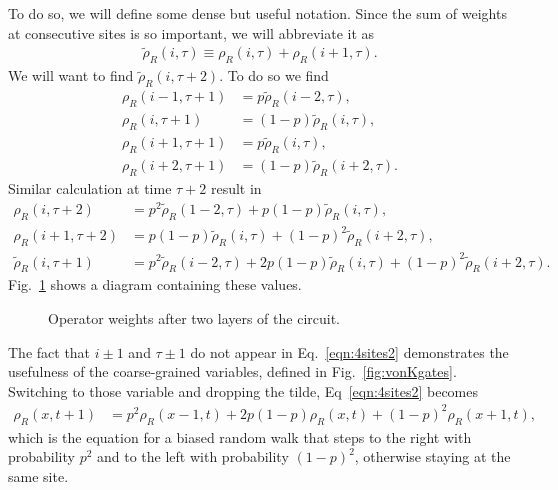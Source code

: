 \documentclass[a4paper,11pt]{article}
\renewcommand{\t}{\tau}
\newcommand{\nn}{\nonumber\\}
\begin{document}
To do so, we will define some dense but useful notation. Since the sum of weights at consecutive sites is so important, we will abbreviate it as
\begin{align}
\tilde{\rho}_R(i,\t) \equiv \rho_R(i,\tau) + \rho_R(i+1, \tau). \label{eqn:rhotil}
\end{align}
We will want to find $\tilde{\rho}_R(i,\t+2)$. To do so we find
\begin{align}
\rho_R(i-1, \t+1) &=    p  \tilde{\rho}_R(i-2, \t),\nn
\rho_R(i  , \t+1) &= (1-p) \tilde{\rho}_R(i  , \t),\nn
\rho_R(i+1, \t+1) &=    p  \tilde{\rho}_R(i  , \t),\nn
\rho_R(i+2, \t+1) &= (1-p) \tilde{\rho}_R(i+2, \t).\label{eqn:4sites1}
\end{align}
Similar calculation at time $\t+2$ result in
\begin{align}
\rho_R(i  , \t+2) &= p^2\tilde{\rho}_R(1-2,\t) + p(1-p)\tilde{\rho}_R(i,\t),\nn
\rho_R(i+1, \t+2) &= p(1-p)\tilde{\rho}_R(i,\t) + (1-p)^2\tilde{\rho}_R(i+2,
	\t), \nn
\tilde{\rho}_R(i,\t+1)&=p^2\tilde{\rho}_R(i-2,\t)+2p(1-p)\tilde{\rho}_R(i,\t)+
	(1-p)^2\tilde{\rho}_R(i+2,\t). \label{eqn:4sites2}
\end{align}
Fig.~\ref{fig:4sites} shows a diagram containing these values.
\begin{figure}
	\centering
	
	\caption{Operator weights after two layers of the circuit.}
	\label{fig:4sites}
\end{figure}

The fact that $i\pm1$ and $\t\pm1$ do not appear in Eq.~\ref{eqn:4sites2} demonstrates the usefulness of the coarse-grained variables, defined in Fig.~\ref{fig:vonKgates}. Switching to those variable and dropping the tilde, Eq~\ref{eqn:4sites2} becomes
\begin{align}
\rho_R(x,t+1)&=p^2\rho_R(x-1,t)+2p(1-p)\rho_R(x,t)+(1-p)^2\rho_R(x+1,t), 
	\label{eqn:4sites3}
\end{align}
which is the equation for a biased random walk that steps to the right with probability $p^2$ and to the left with probability $(1-p)^2$, otherwise staying at the same site. 
\end{document}
